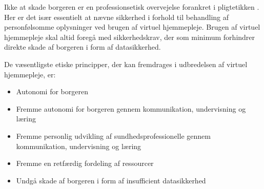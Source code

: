 Ikke at skade borgeren er en professionsetisk overvejelse forankret i pligtetikken \cite{mtv}. Her er det især essentielt at nævne sikkerhed i forhold til behandling af personfølsomme oplysninger ved brugen af virtuel hjemmepleje. Brugen af virtuel hjemmepleje skal altid foregå med sikkerhedskrav, der som minimum forhindrer direkte skade af borgeren i form af datasikkerhed.

De væsentligste etiske principper, der kan fremdrages i udbredelsen af virtuel hjemmepleje, er:
\begin{itemize}
	\item Autonomi for borgeren
	\item Fremme autonomi for borgeren gennem kommunikation, undervisning og læring
	\item Fremme personlig udvikling af sundhedsprofessionelle gennem kommunikation, undervisning og læring
	\item Fremme en retfærdig fordeling af ressourcer 
	\item Undgå skade af borgeren i form af insufficient datasikkerhed
\end{itemize}





